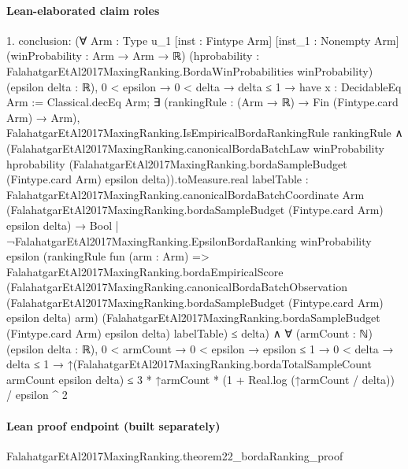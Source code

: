 \documentclass[10pt]{article}
\begin{document}
\paragraph{Lean-elaborated claim roles}\begin{ReviewVerbatim}
1. conclusion: (∀ {Arm : Type u_1} [inst : Fintype Arm] [inst_1 : Nonempty Arm] (winProbability : Arm → Arm → ℝ)
    (hprobability : FalahatgarEtAl2017MaxingRanking.BordaWinProbabilities winProbability) (epsilon delta : ℝ),
    0 < epsilon →
      0 < delta →
        delta ≤ 1 →
          have x : DecidableEq Arm := Classical.decEq Arm;
          ∃ (rankingRule : (Arm → ℝ) → Fin (Fintype.card Arm) → Arm),
            FalahatgarEtAl2017MaxingRanking.IsEmpiricalBordaRankingRule rankingRule ∧
              (FalahatgarEtAl2017MaxingRanking.canonicalBordaBatchLaw winProbability hprobability
                        (FalahatgarEtAl2017MaxingRanking.bordaSampleBudget (Fintype.card Arm) epsilon
                          delta)).toMeasure.real
                  {labelTable :
                    FalahatgarEtAl2017MaxingRanking.canonicalBordaBatchCoordinate Arm
                        (FalahatgarEtAl2017MaxingRanking.bordaSampleBudget (Fintype.card Arm) epsilon delta) →
                      Bool |
                    ¬FalahatgarEtAl2017MaxingRanking.EpsilonBordaRanking winProbability epsilon
                        (rankingRule fun (arm : Arm) =>
                          FalahatgarEtAl2017MaxingRanking.bordaEmpiricalScore
                            (FalahatgarEtAl2017MaxingRanking.canonicalBordaBatchObservation
                              (FalahatgarEtAl2017MaxingRanking.bordaSampleBudget (Fintype.card Arm) epsilon delta) arm)
                            (FalahatgarEtAl2017MaxingRanking.bordaSampleBudget (Fintype.card Arm) epsilon delta)
                            labelTable)} ≤
                delta) ∧
  ∀ (armCount : ℕ) (epsilon delta : ℝ),
    0 < armCount →
      0 < epsilon →
        epsilon ≤ 1 →
          0 < delta →
            delta ≤ 1 →
              ↑(FalahatgarEtAl2017MaxingRanking.bordaTotalSampleCount armCount epsilon delta) ≤
                3 * ↑armCount * (1 + Real.log (↑armCount / delta)) / epsilon ^ 2
\end{ReviewVerbatim}

\paragraph{Lean proof endpoint (built separately)}\begin{ReviewVerbatim}
FalahatgarEtAl2017MaxingRanking.theorem22_bordaRanking_proof
\end{ReviewVerbatim}
\end{document}
